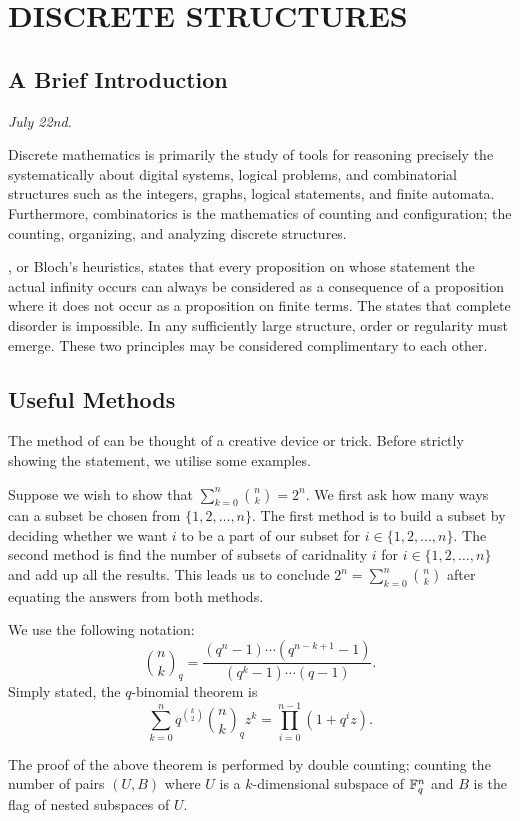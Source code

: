 \chapter{DISCRETE STRUCTURES}

\section{A Brief Introduction}
\textit{July 22nd.}

Discrete mathematics is primarily the study of tools for reasoning precisely the systematically about digital systems, logical problems, and combinatorial structures such as the integers, graphs, logical statements, and finite automata. Furthermore, combinatorics is the mathematics of counting and configuration; the counting, organizing, and analyzing discrete structures. 

, or Bloch's heuristics, states that every proposition on whose statement the actual infinity occurs can always be considered as a consequence of a proposition where it does not occur as a proposition on finite terms. The  states that complete disorder is impossible. In any sufficiently large structure, order or regularity must emerge. These two principles may be considered complimentary to each other.

\section{Useful Methods}
The method of  can be thought of a creative device or trick. Before strictly showing the statement, we utilise some examples.
\begin{example}
    Suppose we wish to show that $\sum_{k=0}^{n} \binom{n}{k} = 2^{n}$. We first ask how many ways can a subset be chosen from $\{1,2,\ldots,n\}$. The first method is to build a subset by deciding whether we want $i$ to be a part of our subset for $i \in \{1,2,...,n\}$. The second method is find the number of subsets of caridnality $i$ for $i \in \{1,2,\ldots,n\}$ and add up all the results. This leads us to conclude $2^{n} = \sum_{k=0}^{n} \binom{n}{k}$ after equating the answers from both methods.
\end{example}

\begin{theorem}
    We use the following notation:
    \begin{equation}
        \binom{n}{k}_{q} = \frac{(q^{n}-1) \cdots (q^{n-k+1}-1)}{(q^{k}-1) \cdots (q-1)}.
    \end{equation}
    Simply stated, the $q$-binomial theorem is
    \begin{equation}
        \sum_{k=0}^{n} q^{\binom{k}{2}} \binom{n}{k}_{q} z^{k} = \prod_{i=0}^{n-1} (1+q^{i}z).
    \end{equation}
\end{theorem}
The proof of the above theorem is performed by double counting; counting the number of pairs $(U,B)$ where $U$ is a $k$-dimensional subspace of $\mathbb{F}^{n}_{q}$ and $B$ is the flag of nested subspaces of $U$.

